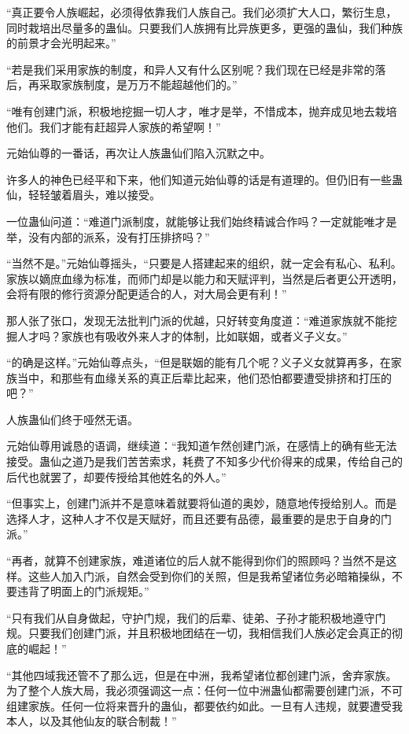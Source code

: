 \begin{this_body}
“真正要令人族崛起，必须得依靠我们人族自己。我们必须扩大人口，繁衍生息，同时栽培出尽量多的蛊仙。只要我们人族拥有比异族更多，更强的蛊仙，我们种族的前景才会光明起来。”

“若是我们采用家族的制度，和异人又有什么区别呢？我们现在已经是非常的落后，再采取家族制度，是万万不能超越他们的。”

“唯有创建门派，积极地挖掘一切人才，唯才是举，不惜成本，抛弃成见地去栽培他们。我们才能有赶超异人家族的希望啊！”

元始仙尊的一番话，再次让人族蛊仙们陷入沉默之中。

许多人的神色已经平和下来，他们知道元始仙尊的话是有道理的。但仍旧有一些蛊仙，轻轻皱着眉头，难以接受。

一位蛊仙问道：“难道门派制度，就能够让我们始终精诚合作吗？一定就能唯才是举，没有内部的派系，没有打压排挤吗？”

“当然不是。”元始仙尊摇头，“只要是人搭建起来的组织，就一定会有私心、私利。家族以嫡庶血缘为标准，而师门却是以能力和天赋评判，当然是后者更公开透明，会将有限的修行资源分配更适合的人，对大局会更有利！”

那人张了张口，发现无法批判门派的优越，只好转变角度道：“难道家族就不能挖掘人才吗？家族也有吸收外来人才的体制，比如联姻，或者义子义女。”

“的确是这样。”元始仙尊点头，“但是联姻的能有几个呢？义子义女就算再多，在家族当中，和那些有血缘关系的真正后辈比起来，他们恐怕都要遭受排挤和打压的吧？”

人族蛊仙们终于哑然无语。

元始仙尊用诚恳的语调，继续道：“我知道乍然创建门派，在感情上的确有些无法接受。蛊仙之道乃是我们苦苦索求，耗费了不知多少代价得来的成果，传给自己的后代也就罢了，却要传授给其他姓名的外人。”

“但事实上，创建门派并不是意味着就要将仙道的奥妙，随意地传授给别人。而是选择人才，这种人才不仅是天赋好，而且还要有品德，最重要的是忠于自身的门派。”

“再者，就算不创建家族，难道诸位的后人就不能得到你们的照顾吗？当然不是这样。这些人加入门派，自然会受到你们的关照，但是我希望诸位务必暗箱操纵，不要违背了明面上的门派规矩。”

“只有我们从自身做起，守护门规，我们的后辈、徒弟、子孙才能积极地遵守门规。只要我们创建门派，并且积极地团结在一切，我相信我们人族必定会真正的彻底的崛起！”

“其他四域我还管不了那么远，但是在中洲，我希望诸位都创建门派，舍弃家族。为了整个人族大局，我必须强调这一点：任何一位中洲蛊仙都需要创建门派，不可组建家族。任何一位将来晋升的蛊仙，都要依约如此。一旦有人违规，就要遭受我本人，以及其他仙友的联合制裁！”


\end{this_body}

